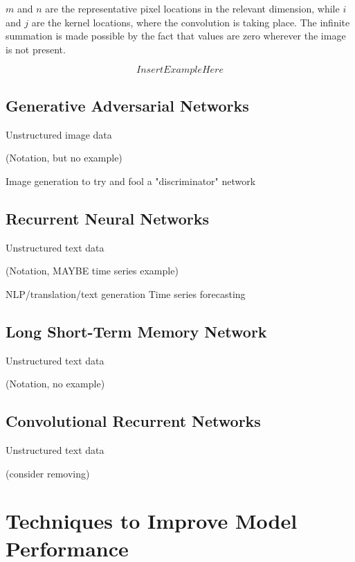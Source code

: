 $m$ and $n$ are the representative pixel locations in the relevant dimension, while $i$ and $j$ are the kernel locations, where the convolution is taking place.  The infinite summation is made possible by the fact that values are zero wherever the image is not present.



$$
Insert Example Here
$$



\subsection{Generative Adversarial Networks}
Unstructured image data

(Notation, but no example)

Image generation to try and fool a "discriminator" network

\subsection{Recurrent Neural Networks}
Unstructured text data

(Notation, MAYBE time series example)

NLP/translation/text generation
Time series forecasting

\subsection{Long Short-Term Memory Network}
Unstructured text data

(Notation, no example)

\subsection{Convolutional Recurrent Networks}
Unstructured text data

(consider removing)

\section{Techniques to Improve Model Performance} %


